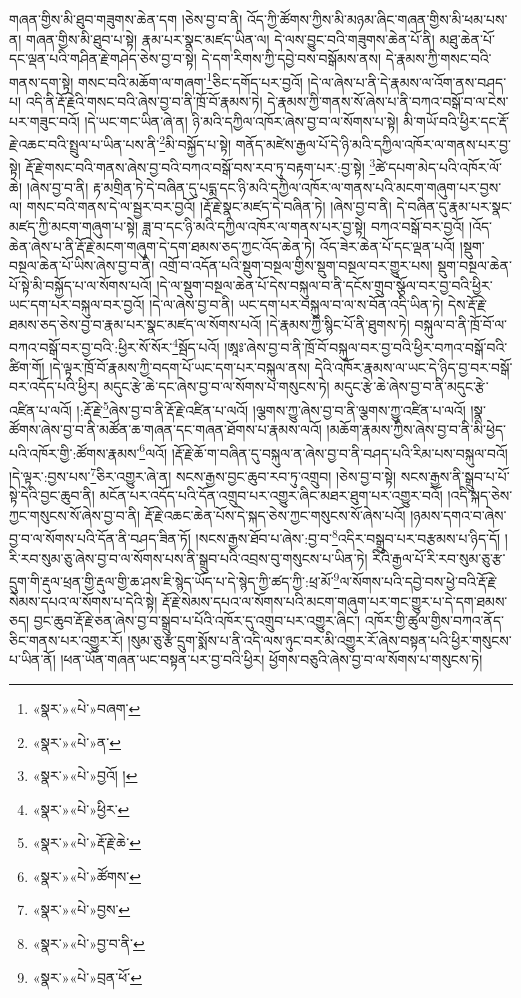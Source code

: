 གཞན་གྱིས་མི་ཐུབ་གཟུགས་ཆེན་དག །ཅེས་བྱ་བ་ནི། འོད་ཀྱི་ཚོགས་ཀྱིས་མི་མཉམ་ཞིང་གཞན་གྱིས་མི་ཕམ་པས་ན། གཞན་གྱིས་མི་ཐུབ་པ་སྟེ། རྣམ་པར་སྣང་མཛད་ཡིན་ལ། དེ་ལས་བྱུང་བའི་གཟུགས་ཆེན་པོ་ནི། མཐུ་ཆེན་པོ་དང་ལྡན་པའི་གཤིན་རྗེ་གཤེད་ཅེས་བྱ་བ་སྟེ། དེ་དག་རིགས་ཀྱི་དབྱེ་བས་བསྒོམས་ནས། དེ་རྣམས་ཀྱི་གསང་བའི་གནས་དག་སྟེ། གསང་བའི་མཆོག་ལ་གཞག་\footnote{«སྣར་»«པེ་»བཞག་}ཅིང་དགོད་པར་བྱའོ། །དེ་ལ་ཞེས་པ་ནི་དེ་རྣམས་ལ་འོག་ནས་བཤད་པ། འདི་ནི་རྡོ་རྗེའི་གསང་བའི་ཞེས་བྱ་བ་ནི་ཁྲོ་བོ་རྣམས་ཏེ། དེ་རྣམས་ཀྱི་གནས་སོ་ཞེས་པ་ནི་བཀའ་བསྒོ་བ་ལ་ངེས་པར་གཟུང་བའོ། །དེ་ཡང་གང་ཡིན་ཞེ་ན། ཉི་མའི་དཀྱིལ་འཁོར་ཞེས་བྱ་བ་ལ་སོགས་པ་སྟེ། མི་གཡོ་བའི་ཕྱིར་དང་རྡོ་རྗེ་འཆང་བའི་སྤྲུལ་པ་ཡིན་པས་ནི་\footnote{«སྣར་»«པེ་»ན་}མི་བསྐྱོད་པ་སྟེ། གནོད་མཛེས་རྒྱལ་པོ་དེ་ཉི་མའི་དཀྱིལ་འཁོར་ལ་གནས་པར་བྱ་སྟེ། རྡོ་རྗེ་གསང་བའི་གནས་ཞེས་བྱ་བའི་བཀའ་བསྒོ་བས་རབ་ཏུ་བརྟག་པར་:བྱ་སྟེ། \footnote{«སྣར་»«པེ་»བྱའོ། ། }ཚེ་དཔག་མེད་པའི་འཁོར་ལོ་ཆེ། །ཞེས་བྱ་བ་ནི། རྟ་མགྲིན་ཏེ་དེ་བཞིན་དུ་པདྨ་དང་ཉི་མའི་དཀྱིལ་འཁོར་ལ་གནས་པའི་མངག་གཞུག་པར་བྱས་ལ། གསང་བའི་གནས་དེ་ལ་སྦྱར་བར་བྱའོ། །རྡོ་རྗེ་སྣང་མཛད་དེ་བཞིན་ཏེ། །ཞེས་བྱ་བ་ནི། དེ་བཞིན་དུ་རྣམ་པར་སྣང་མཛད་ཀྱི་མངག་གཞུག་པ་སྟེ། ཟླ་བ་དང་ཉི་མའི་དཀྱིལ་འཁོར་ལ་གནས་པར་བྱ་སྟེ། བཀའ་བསྒོ་བར་བྱའོ། །འོད་ཆེན་ཞེས་པ་ནི་རྡོ་རྗེ་མངག་གཞུག་དེ་དག་ཐམས་ཅད་ཀྱང་འོད་ཆེན་ཏེ། འོད་ཟེར་ཆེན་པོ་དང་ལྡན་པའོ། །སྡུག་བསྔལ་ཆེན་པོ་ཡིས་ཞེས་བྱ་བ་ནི། འགྲོ་བ་འདོན་པའི་སྡུག་བསྔལ་གྱིས་སྡུག་བསྔལ་བར་གྱུར་པས། སྡུག་བསྔལ་ཆེན་པོ་སྟེ་མི་བསྐྱོད་པ་ལ་སོགས་པའོ། །དེ་ལ་སྡུག་བསྔལ་ཆེན་པོ་དེས་བསྐུལ་བ་ནི་དངོས་གྲུབ་སྩོལ་བར་བྱ་བའི་ཕྱིར་ཡང་དག་པར་བསྐུལ་བར་བྱའོ། །དེ་ལ་ཞེས་བྱ་བ་ནི། ཡང་དག་པར་བསྐུལ་བ་ལ་ས་བོན་འདི་ཡིན་ཏེ། དེས་རྡོ་རྗེ་ཐམས་ཅད་ཅེས་བྱ་བ་རྣམ་པར་སྣང་མཛད་ལ་སོགས་པའོ། །དེ་རྣམས་ཀྱི་སྙིང་པོ་ནི་ཐུགས་ཏེ། བསྐུལ་བ་ནི་ཁྲོ་བོ་ལ་བཀའ་བསྒོ་བར་བྱ་བའི་:ཕྱིར་སོ་སོར་\footnote{«སྣར་»«པེ་»ཕྱིར་}སྦོད་པའོ། །ཨཱཿ་ཞེས་བྱ་བ་ནི་ཁྲོ་བོ་བསྐུལ་བར་བྱ་བའི་ཕྱིར་བཀའ་བསྒོ་བའི་ཚིག་གོ། །དེ་ལྟར་ཁྲོ་བོ་རྣམས་ཀྱི་བདག་པོ་ཡང་དག་པར་བསྐུལ་ནས། དེའི་འཁོར་རྣམས་ལ་ཡང་དེ་ཉིད་བྱ་བར་བསྒོ་བར་འདོད་པའི་ཕྱིར། མདུང་རྩེ་ཆེ་དང་ཞེས་བྱ་བ་ལ་སོགས་པ་གསུངས་ཏེ། མདུང་རྩེ་ཆེ་ཞེས་བྱ་བ་ནི་མདུང་རྩེ་འཛིན་པ་ལའོ། །:རྡོ་རྗེ་\footnote{«སྣར་»«པེ་»རྡོ་རྗེ་ཆེ་}ཞེས་བྱ་བ་ནི་རྡོ་རྗེ་འཛིན་པ་ལའོ། །ལྕགས་ཀྱུ་ཞེས་བྱ་བ་ནི་ལྕགས་ཀྱུ་འཛིན་པ་ལའོ། །སྣ་ཚོགས་ཞེས་བྱ་བ་ནི་མཚོན་ཆ་གཞན་དང་གཞན་ཐོགས་པ་རྣམས་ལའོ། །མཆོག་རྣམས་ཀྱིས་ཞེས་བྱ་བ་ནི་མི་ཕྱེད་པའི་འཁོར་གྱི་:ཚོགས་རྣམས་\footnote{«སྣར་»«པེ་»ཚོགས་}ལའོ། །རྡོ་རྗེ་ཆོ་ག་བཞིན་དུ་བསྐུལ་ན་ཞེས་བྱ་བ་ནི་བཤད་པའི་རིམ་པས་བསྐུལ་བའོ། །དེ་ལྟར་:བྱས་པས་\footnote{«སྣར་»«པེ་»བྱས་}ཅིར་འགྱུར་ཞེ་ན། སངས་རྒྱས་བྱང་ཆུབ་རབ་ཏུ་འགྲུབ། །ཅེས་བྱ་བ་སྟེ། སངས་རྒྱས་ནི་སྒྲུབ་པ་པོ་སྟེ་དེའི་བྱང་ཆུབ་ནི། མངོན་པར་འདོད་པའི་དོན་འགྲུབ་པར་འགྱུར་ཞིང་མཐར་ཐུག་པར་འགྱུར་བའོ། །འདི་སྐད་ཅེས་ཀྱང་གསུངས་སོ་ཞེས་བྱ་བ་ནི། རྡོ་རྗེ་འཆང་ཆེན་པོས་དེ་སྐད་ཅེས་ཀྱང་གསུངས་སོ་ཞེས་པའོ། །ཉམས་དགའ་བ་ཞེས་བྱ་བ་ལ་སོགས་པའི་དོན་ནི་བཤད་ཟིན་ཏོ། །སངས་རྒྱས་ཐོབ་པ་ཞེས་:བྱ་བ་\footnote{«སྣར་»«པེ་»བྱ་བ་ནི་}འདིར་བསྒྲུབ་པར་བརྩམས་པ་ཉིད་དོ། །རི་རབ་སུམ་ཅུ་ཞེས་བྱ་བ་ལ་སོགས་པས་ནི་སྒྲུབ་པའི་འབྲས་བུ་གསུངས་པ་ཡིན་ཏེ། རིའི་རྒྱལ་པོ་རི་རབ་སུམ་ཅུ་རྩ་དྲུག་གི་རྡུལ་ཕྲན་གྱི་རྡུལ་གྱི་ཆ་ཤས་ཇི་སྙེད་ཡོད་པ་དེ་སྙེད་ཀྱི་ཚད་ཀྱི་:ཕྲ་མོ་\footnote{«སྣར་»«པེ་»བྲན་ཕོ་}ལ་སོགས་པའི་དབྱེ་བས་ཕྱེ་བའི་རྡོ་རྗེ་སེམས་དཔའ་ལ་སོགས་པ་དེའི་སྟེ། རྡོ་རྗེ་སེམས་དཔའ་ལ་སོགས་པའི་མངག་གཞུག་པར་གང་གྱུར་པ་དེ་དག་ཐམས་ཅད། བྱང་ཆུབ་རྡོ་རྗེ་ཅན་ཞེས་བྱ་བ་སྒྲུབ་པ་པོའི་འཁོར་དུ་འགྲུབ་པར་འགྱུར་ཞིང་། འཁོར་གྱི་ཚུལ་གྱིས་བཀའ་ནོད་ཅིང་གནས་པར་འགྱུར་རོ། །སུམ་ཅུ་རྩ་དྲུག་སྨོས་པ་ནི་འདི་ལས་ཉུང་བར་མི་འགྱུར་རོ་ཞེས་བསྟན་པའི་ཕྱིར་གསུངས་པ་ཡིན་ནོ། །ཕན་ཡོན་གཞན་ཡང་བསྟན་པར་བྱ་བའི་ཕྱིར། ཕྱོགས་བཅུའི་ཞེས་བྱ་བ་ལ་སོགས་པ་གསུངས་ཏེ། 